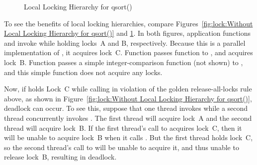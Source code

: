 \begin{figure}[tb]
\begin{center}
\end{center}
\caption{Local Locking Hierarchy for qsort()}
\label{fig:lock:Local Locking Hierarchy for qsort()}
\end{figure}

To see the benefits of local locking hierarchies, compare
Figures~\ref{fig:lock:Without Local Locking Hierarchy for qsort()} and
\ref{fig:lock:Local Locking Hierarchy for qsort()}.
In both figures, application functions  and 
invoke  while holding locks~A and B, respectively.
Because this is a parallel implementation of , it acquires
lock~C.
Function  passes function  to ,
and  acquires lock~B.
Function  passes a simple integer-comparison function (not
shown) to , and this simple function does not acquire any
locks.

Now, if  holds Lock~C while calling  in violation
of the golden release-all-locks rule above, as shown in
Figure~\ref{fig:lock:Without Local Locking Hierarchy for qsort()},
deadlock can occur.
To see this, suppose that one thread invokes  while a second
thread concurrently invokes .
The first thread will acquire lock~A and the second thread will acquire
lock~B.
If the first thread's call to  acquires lock~C, then it
will be unable to acquire lock~B when it calls .
But the first thread holds lock~C, so the second thread's call to
 will be unable to acquire it, and thus unable to release
lock~B, resulting in deadlock.

